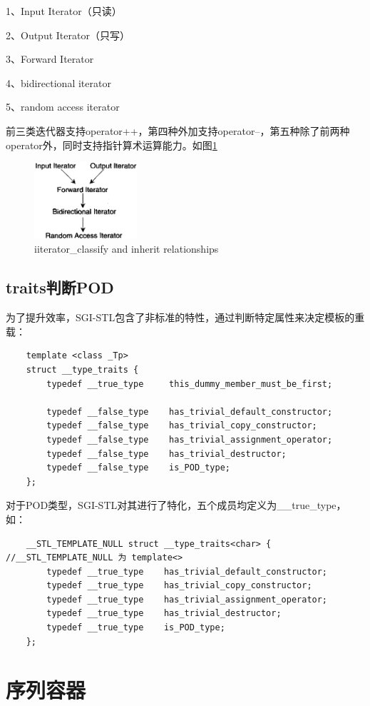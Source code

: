 \documentclass[a4paper,fontset=mac]{ctexart}
\begin{document}
		1、Input Iterator（只读）
		
		2、Output Iterator（只写）
		
		3、Forward Iterator
		
		4、bidirectional iterator
		
		5、random access iterator
		
		前三类迭代器支持operator++，第四种外加支持operator--，第五种除了前两种operator外，同时支持指针算术运算能力。如图\ref{iterator classify and inherit relationships}
		\begin{figure}
			\centering
			\includegraphics[width=1.5in]{iterator_classify}
			\caption{iiterator\_classify and inherit relationships}
			\label{iterator classify and inherit relationships} %
		\end{figure}
	
	\subsection{traits判断POD}
	为了提升效率，SGI-STL包含了非标准的特性，通过判断特定属性来决定模板的重载：
	\begin{lstlisting}
	template <class _Tp>
	struct __type_traits { 
		typedef __true_type     this_dummy_member_must_be_first;
		
		typedef __false_type    has_trivial_default_constructor;
		typedef __false_type    has_trivial_copy_constructor;
		typedef __false_type    has_trivial_assignment_operator;
		typedef __false_type    has_trivial_destructor;
		typedef __false_type    is_POD_type;
	};
	\end{lstlisting}
	对于POD类型，SGI-STL对其进行了特化，五个成员均定义为\_\_true\_type，如：
	\begin{lstlisting}
	__STL_TEMPLATE_NULL struct __type_traits<char> { //__STL_TEMPLATE_NULL 为 template<>
		typedef __true_type    has_trivial_default_constructor;
		typedef __true_type    has_trivial_copy_constructor;
		typedef __true_type    has_trivial_assignment_operator;
		typedef __true_type    has_trivial_destructor;
		typedef __true_type    is_POD_type; 
	};
	\end{lstlisting}
	
	\section{序列容器}
\end{document}
